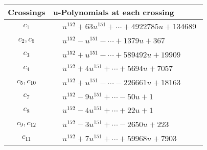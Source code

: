 \documentclass[1p]{elsarticle_modified}
\theoremstyle{definition}
\begin{document}
\begin{tabular}{m{50pt}|m{274pt}}
Crossings & \hspace{64pt}u-Polynomials at each crossing \\
\hline $$\begin{aligned}c_{1}\end{aligned}$$&$\begin{aligned}
&u^{152}+63 u^{151}+\cdots+4922785 u+134689
\end{aligned}$\\
\hline $$\begin{aligned}c_{2},c_{6}\end{aligned}$$&$\begin{aligned}
&u^{152}- u^{151}+\cdots+1379 u+367
\end{aligned}$\\
\hline $$\begin{aligned}c_{3}\end{aligned}$$&$\begin{aligned}
&u^{152}+u^{151}+\cdots+589492 u+19909
\end{aligned}$\\
\hline $$\begin{aligned}c_{4}\end{aligned}$$&$\begin{aligned}
&u^{152}+4 u^{151}+\cdots+5694 u+7057
\end{aligned}$\\
\hline $$\begin{aligned}c_{5},c_{10}\end{aligned}$$&$\begin{aligned}
&u^{152}+u^{151}+\cdots-226661 u+18163
\end{aligned}$\\
\hline $$\begin{aligned}c_{7}\end{aligned}$$&$\begin{aligned}
&u^{152}-9 u^{151}+\cdots-50 u+1
\end{aligned}$\\
\hline $$\begin{aligned}c_{8}\end{aligned}$$&$\begin{aligned}
&u^{152}-4 u^{151}+\cdots+22 u+1
\end{aligned}$\\
\hline $$\begin{aligned}c_{9},c_{12}\end{aligned}$$&$\begin{aligned}
&u^{152}-3 u^{151}+\cdots-2650 u+223
\end{aligned}$\\
\hline $$\begin{aligned}c_{11}\end{aligned}$$&$\begin{aligned}
&u^{152}+7 u^{151}+\cdots+59968 u+7903
\end{aligned}$\\
\hline
\end{tabular}\\~\\
\end{document}
